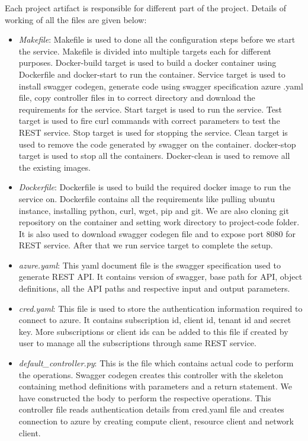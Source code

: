 Each project artifact is responsible for different part of the project. Details
of working of all the files are given below:
\begin{itemize}

\item \textit{Makefile}: Makefile is used to done all the configuration steps
before we start the service. Makefile is divided into multiple targets each for
different purposes. Docker-build target is used to build a docker container
using Dockerfile and docker-start to run the container. Service target is used
to install swagger codegen, generate code using swagger specification azure
.yaml file, copy controller files in to correct directory and download the
requirements for the service. Start target is used to run the
service. Test target is used to fire curl commands with correct parameters to
test the REST service. Stop target is used for stopping the service. Clean
target is used to remove the code generated by swagger on the container.
docker-stop target is used to stop all the containers. Docker-clean is used to
remove all the existing images.

\item \textit{Dockerfile}: Dockerfile is used to build the required docker
image to run the service on. Dockerfile contains all the requirements like
pulling ubuntu instance, installing python, curl, wget, pip and git. We are
also cloning git repository on the container and setting work directory to
project-code folder. It is also used to download swagger codegen file and to
expose port 8080 for REST service. After that we run service target to complete
the setup.

\item \textit{azure.yaml}: This yaml document file is the swagger specification
used to generate REST API. It contains version of swagger, base path for
API, object definitions, all the API paths and respective input and output
parameters.

\item \textit{cred.yaml}: This file is used to store the authentication
information required to connect to azure. It contains subscription id, client
id, tenant id and secret key. More subscriptions or client ids can be added to
this file if created by user to manage all the subscriptions through same
REST service.

\item \textit{default\_controller.py}: This is the file which contains actual
code to perform the operations. Swagger codegen creates this controller with
the skeleton containing method definitions with parameters and a return
statement. We have constructed the body to perform the respective operations.
This controller file reads authentication details from cred.yaml file and
creates connection to azure by creating compute client, resource client and
network client.

\end{itemize}

